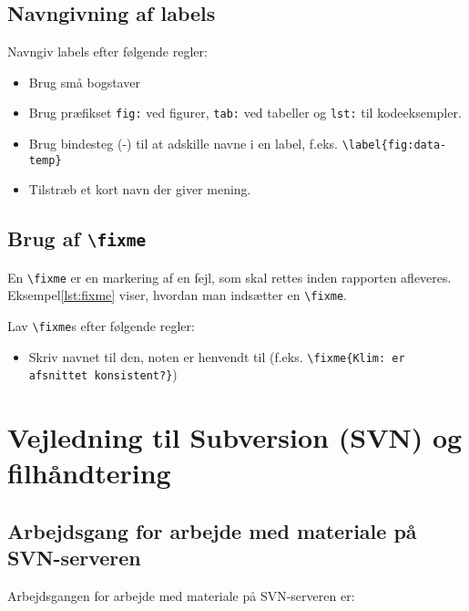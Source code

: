 \documentclass[simple,final]{../mypaper}
\begin{document}
\section{Navngivning af labels}

Navngiv labels efter følgende regler:

\begin{itemize}
\item Brug små bogstaver
\item Brug præfikset \texttt{fig:} ved figurer, \texttt{tab:} ved
  tabeller og \texttt{lst:} til kodeeksempler.
\item Brug bindesteg (-) til at adskille navne i en label,
  f.eks. \texttt{\textbackslash label\{fig:data-temp\}}
\item Tilstræb et kort navn der giver mening.
\end{itemize}


\section{Brug af \texttt{\textbackslash fixme}}

En \texttt{\textbackslash fixme} er en markering af en fejl, som skal
rettes inden rapporten afleveres. Eksempel\vref{lst:fixme} viser,
hvordan man indsætter en \texttt{\textbackslash fixme}.



Lav \texttt{\textbackslash fixme}s efter følgende regler:

\begin{itemize}
\item Skriv navnet til den, noten er henvendt til
  (f.eks. \texttt{\textbackslash fixme\{Klim: er afsnittet
    konsistent?\}})
\end{itemize}


\chapter{Vejledning til Subversion (SVN) og filhåndtering}

\section{Arbejdsgang for arbejde med materiale på SVN-serveren}

Arbejdsgangen for arbejde med materiale på SVN-serveren er:
\end{document}
